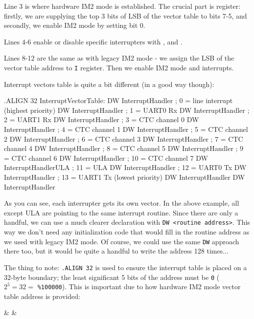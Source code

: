Line 3 is where hardware IM2 mode is established. The crucial part is  register: firstly, we are supplying the top 3 bits of LSB of the vector table to bits 7-5, and secondly, we enable IM2 mode by setting bit 0.

Lines 4-6 enable or disable specific interrupters with ,  and .

Lines 8-12 are the same as with legacy IM2 mode - we assign the LSB of the vector table address to {\tt I} register. Then we enable IM2 mode and interrupts.

Interrupt vectors table is quite a bit different (in a good way though):

\begin{tcblisting}{}
	.ALIGN 32
InterruptVectorTable:
	DW InterruptHandler        ; 0 = line interrupt (highest priority)
	DW InterruptHandler        ; 1 = UART0 Rx
	DW InterruptHandler        ; 2 = UART1 Rx
	DW InterruptHandler        ; 3 = CTC channel 0
	DW InterruptHandler        ; 4 = CTC channel 1
	DW InterruptHandler        ; 5 = CTC channel 2
	DW InterruptHandler        ; 6 = CTC channel 3
	DW InterruptHandler        ; 7 = CTC channel 4
	DW InterruptHandler        ; 8 = CTC channel 5
	DW InterruptHandler        ; 9 = CTC channel 6
	DW InterruptHandler        ; 10 = CTC channel 7
	DW InterruptHandlerULA     ; 11 = ULA
	DW InterruptHandler        ; 12 = UART0 Tx
	DW InterruptHandler        ; 13 = UART1 Tx (lowest priority)
	DW InterruptHandler
	DW InterruptHandler
\end{tcblisting}

As you can see, each interrupter gets its own vector. In the above example, all except ULA are pointing to the same interrupt routine. Since there are only a handful, we can use a much clearer declaration with {\tt DW <routine address>}. This way we don't need any initialization code that would fill in the routine address as we used with legacy IM2 mode. Of course, we could use the same {\tt DW} approach there too, but it would be quite a handful to write the address 128 times...

The thing to note: {\tt .ALIGN 32} is used to ensure the interrupt table is placed on a 32-byte boundary; the least significant 5 bits of the address must be {\tt 0} ($2^5=32=$ {\tt \%100000}). This is important due to how hardware IM2 mode vector table address is provided:

\begin{BitTableWord}
	 &  &  \\
\end{BitTableWord}

